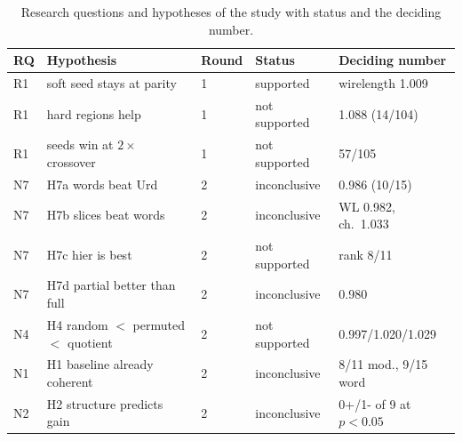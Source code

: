 \begin{table}[t]
\caption{Research questions and hypotheses of the study with status and the deciding number.}
\label{tab:r2log}
\centering
\footnotesize\setlength{\tabcolsep}{3pt}
\begin{tabular}{@{}lp{2.5cm}lp{1.5cm}p{2.2cm}@{}}
\toprule
RQ & Hypothesis & Round & Status & Deciding number \\
\midrule
R1 & soft seed stays at parity & 1 & supported & wirelength 1.009 \\
R1 & hard regions help & 1 & not supported & 1.088 (14/104) \\
R1 & seeds win at $2\times$ crossover & 1 & not supported & 57/105 \\
N7 & H7a words beat Urd & 2 & inconclusive & 0.986 (10/15) \\
N7 & H7b slices beat words & 2 & inconclusive & WL 0.982, ch.\ 1.033 \\
N7 & H7c hier is best & 2 & not supported & rank 8/11 \\
N7 & H7d partial better than full & 2 & inconclusive & 0.980 \\
N4 & H4 random $<$ permuted $<$ quotient & 2 & not supported & 0.997/1.020/1.029 \\
N1 & H1 baseline already coherent & 2 & inconclusive & 8/11 mod., 9/15 word \\
N2 & H2 structure predicts gain & 2 & inconclusive & 0+/1- of 9 at $p<0.05$ \\
\bottomrule
\end{tabular}
\end{table}
